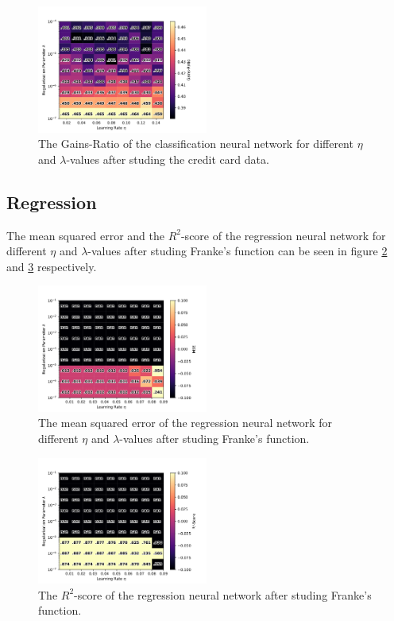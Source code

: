 		\begin{figure}[H]
			\centering
			\includegraphics[width=0.5\textwidth]{figures/cc_res_3.pdf}
			\caption{The Gains-Ratio of the classification neural network for different $\eta$ and $\lambda$-values after studing the credit card data.}
			\label{fig:cc_gr}
		\end{figure}
	
        
        
    \subsection{Regression}
    
    	The mean squared error and the $R^2$-score of the regression neural network for different $\eta$ and $\lambda$-values after studing Franke's function can be seen in figure \ref{fig:ff_mse} and \ref{fig:ff_r2} respectively.
    
    	\begin{figure}[H]
    		\centering
    		\includegraphics[width=0.5\textwidth]{figures/ff_res_0.pdf}
    		\caption{The mean squared error of the regression neural network for different $\eta$ and $\lambda$-values after studing Franke's function.}
    		\label{fig:ff_mse}
    	\end{figure}
    	\begin{figure}[H]
    		\centering
    		\includegraphics[width=0.5\textwidth]{figures/ff_res_1.pdf}
    		\caption{The $R^2$-score of the regression neural network after studing Franke's function.}
    		\label{fig:ff_r2}
    	\end{figure}
    
